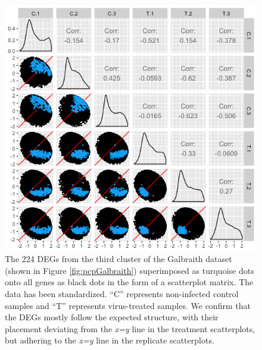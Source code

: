 \documentclass[11pt,a4paper,oldfontcommands,openany]{memoir}
\numberwithin{equation}{section} %
\begin{document}
\begin{figure}[H]
  \includegraphics[width=\textwidth]{Images/GalbraithClust3SM}
  \caption{The 224 DEGs from the third cluster of the Galbraith dataset (shown in Figure \ref{fig:pcpGalbraith}) superimposed as turquoise dots onto all genes as black dots in the form of a scatterplot matrix. The data has been standardized. ``C'' represents non-infected control samples and ``T'' represents virus-treated samples. We confirm that the DEGs mostly follow the expected structure, with their placement deviating from the \textit{x=y} line in the treatment scatterplots, but adhering to the \textit{x=y} line in the replicate scatterplots.}
  \label{fig:GalbraithClust3SM}
\end{figure}
\end{document}
